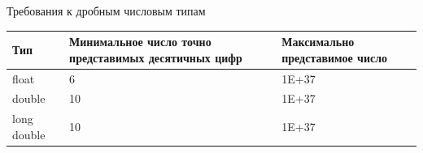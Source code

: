 \documentclass[unknownkeysallowed,xcolor=table]{beamer}
\begin{document}
\begin{frame}[fragile]{Требования к дробным числовым типам}
  \centering
  \begin{tabular}{|C{8em}|C{6em}|C{6em}|}
    \hline
    \bfseries Тип & \bfseries Минимальное число точно представимых десятичных цифр & \bfseries Максимально представимое число \\
    \hline
    float & 6 & 1E+37 \\
    double & 10 & 1E+37 \\
    long double & 10 & 1E+37 \\
    \hline
  \end{tabular}
\end{frame}
\end{document}
